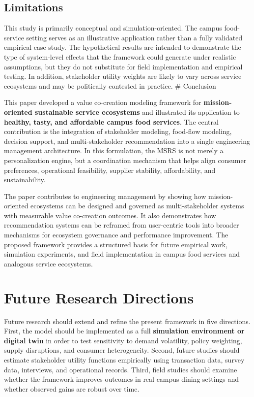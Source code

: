 \documentclass[
  letterpaper,
  DIV=11,
  numbers=noendperiod]{scrartcl}
\begin{document}
\subsection{Limitations}\label{limitations}

This study is primarily conceptual and simulation-oriented. The campus
food-service setting serves as an illustrative application rather than a
fully validated empirical case study. The hypothetical results are
intended to demonstrate the type of system-level effects that the
framework could generate under realistic assumptions, but they do not
substitute for field implementation and empirical testing. In addition,
stakeholder utility weights are likely to vary across service ecosystems
and may be politically contested in practice. \# Conclusion

This paper developed a value co-creation modeling framework for
\textbf{mission-oriented sustainable service ecosystems} and illustrated
its application to \textbf{healthy, tasty, and affordable campus food
services}. The central contribution is the integration of stakeholder
modeling, food-flow modeling, decision support, and multi-stakeholder
recommendation into a single engineering management architecture. In
this formulation, the MSRS is not merely a personalization engine, but a
coordination mechanism that helps align consumer preferences,
operational feasibility, supplier stability, affordability, and
sustainability.

The paper contributes to engineering management by showing how
mission-oriented ecosystems can be designed and governed as
multi-stakeholder systems with measurable value co-creation outcomes. It
also demonstrates how recommendation systems can be reframed from
user-centric tools into broader mechanisms for ecosystem governance and
performance improvement. The proposed framework provides a structured
basis for future empirical work, simulation experiments, and field
implementation in campus food services and analogous service ecosystems.

\section{Future Research Directions}\label{future-research-directions}

Future research should extend and refine the present framework in five
directions. First, the model should be implemented as a full
\textbf{simulation environment or digital twin} in order to test
sensitivity to demand volatility, policy weighting, supply disruptions,
and consumer heterogeneity. Second, future studies should estimate
stakeholder utility functions empirically using transaction data, survey
data, interviews, and operational records. Third, field studies should
examine whether the framework improves outcomes in real campus dining
settings and whether observed gains are robust over time.
\end{document}
